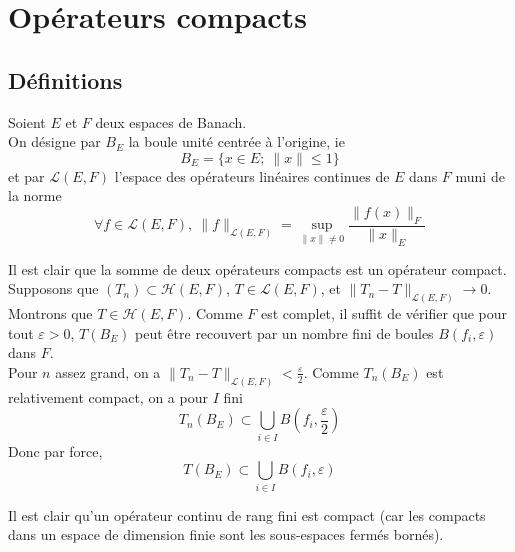 \section{Opérateurs compacts}
\subsection{Définitions}
Soient $E$ et $F$ deux espaces de Banach.\\
On désigne par $B_E$ la boule unité centrée à l'origine, ie \[B_E=\{x\in E;\ \|x\|\leq 1\}\]
et par $\mathscr{L}(E,F)$ l'espace des opérateurs linéaires continues de $E$ dans $F$ muni de la norme \[\forall f\in \mathscr{L}(E,F),\ \|f\|_{\mathscr{L}(E,F)}=\sup_{\|x\|\neq 0} \frac{\|f(x)\|_F}{\|x\|_E}\]



\begin{dem}
Il est clair que la somme de deux opérateurs compacts est un opérateur compact.\\
Supposons que $(T_n)\subset\mathscr{H}(E,F)$, $T\in\mathscr{L}(E,F)$, et $\|T_n-T\|_{\mathscr{L}(E,F)}\to 0$. Montrons que $T\in\mathscr{H}(E,F)$. Comme $F$ est complet, il suffit de vérifier que pour tout $\varepsilon >0$, $T(B_E)$ peut être recouvert par un nombre fini de boules $B(f_i,\varepsilon)$ dans $F$. \\
Pour $n$ assez grand, on a $\|T_n-T\|_{\mathscr{L}(E,F)}<\frac{\varepsilon}{2}$. Comme $T_n(B_E)$ est relativement compact, on a pour $I$ fini \[T_n(B_E)\subset \bigcup_{i\in I} B\left( f_i,\frac{\varepsilon}{2}\right)\]
Donc par force, \[T(B_E)\subset \bigcup_{i\in I} B(f_i, \varepsilon)\]
\end{dem}

Il est clair qu'un opérateur continu de rang fini est compact (car les compacts dans un espace de dimension finie sont les sous-espaces fermés bornés).

